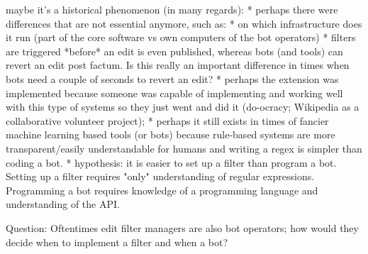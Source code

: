 maybe it's a historical phenomenon (in many regards):
* perhaps there were differences that are not essential anymore, such as:
  * on which infrastructure does it run (part of the core software vs own computers of the bot operators)
  * filters are triggered *before* an edit is even published, whereas bots (and tools) can revert an edit post factum. Is this really an important difference in times when bots need a couple of seconds to revert an edit?
* perhaps the extension was implemented because someone was capable of implementing and working well with this type of systems so they just went and did it (do-ocracy; Wikipedia as a collaborative volunteer project);
* perhaps it still exists in times of fancier machine learning based tools (or bots) because rule-based systems are more transparent/easily understandable for humans and writing a regex is simpler than coding a bot.
* hypothesis: it is easier to set up a filter than program a bot. Setting up a filter requires "only" understanding of regular expressions. Programming a bot requires knowledge of a programming language and understanding of the API.

Question:
Oftentimes edit filter managers are also bot operators; how would they decide when to implement a filter and when a bot?

